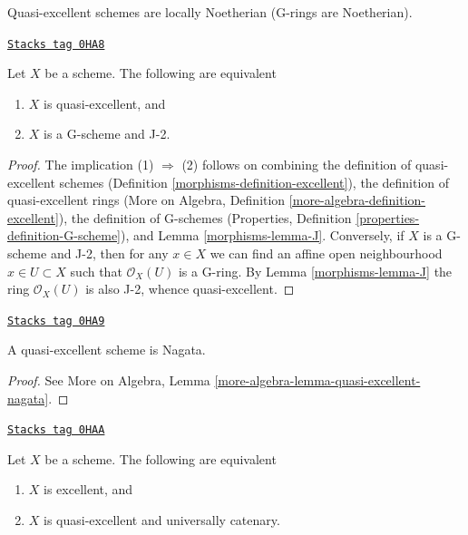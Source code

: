 Quasi-excellent schemes are locally Noetherian (G-rings are Noetherian).

\begin{lemma}
\label{morphisms-lemma-characterize-quasi-excellent}
\href{https://stacks.math.columbia.edu/tag/0HA8}{\texttt{Stacks tag 0HA8}}

Let $X$ be a scheme. The following are equivalent
\begin{enumerate}
\item $X$ is quasi-excellent, and
\item $X$ is a G-scheme and J-2.
\end{enumerate}
\end{lemma}

\begin{proof}

The implication (1) $\Rightarrow$ (2) follows on combining
the definition of quasi-excellent schemes
(Definition \ref{morphisms-definition-excellent}),
the definition of quasi-excellent rings
(More on Algebra, Definition \ref{more-algebra-definition-excellent}),
the definition of G-schemes
(Properties, Definition \ref{properties-definition-G-scheme}), and
Lemma \ref{morphisms-lemma-J}.
Conversely, if $X$ is a G-scheme and J-2, then for any $x \in X$
we can find an affine open neighbourhood $x \in U \subset X$
such that $\mathcal{O}_X(U)$ is a G-ring. By Lemma \ref{morphisms-lemma-J}
the ring $\mathcal{O}_X(U)$ is also J-2, whence quasi-excellent.
\end{proof}

\begin{lemma}
\label{morphisms-lemma-quasi-excellent-nagata}
\href{https://stacks.math.columbia.edu/tag/0HA9}{\texttt{Stacks tag 0HA9}}

A quasi-excellent scheme is Nagata.
\end{lemma}

\begin{proof}
See More on Algebra, Lemma \ref{more-algebra-lemma-quasi-excellent-nagata}.
\end{proof}

\begin{lemma}
\label{morphisms-lemma-characterize-excellent}
\href{https://stacks.math.columbia.edu/tag/0HAA}{\texttt{Stacks tag 0HAA}}

Let $X$ be a scheme. The following are equivalent
\begin{enumerate}
\item $X$ is excellent, and
\item $X$ is quasi-excellent and universally catenary.
\end{enumerate}
\end{lemma}

